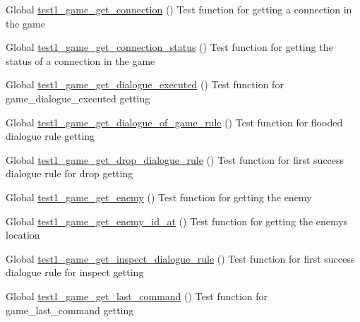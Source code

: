 \begin{DoxyRefList}
\item[Global \mbox{\hyperlink{game__test_8c_a4c69b3df4cea597ed46d4cb428d6f6d9}{test1\+\_\+game\+\_\+get\+\_\+connection}} ()]\label{test__test000258}%
%
Test function for getting a connection in the game  
\item[Global \mbox{\hyperlink{game__test_8c_ad8ab07311d118dabf52340c22652a733}{test1\+\_\+game\+\_\+get\+\_\+connection\+\_\+status}} ()]\label{test__test000255}%
%
Test function for getting the status of a connection in the game  
\item[Global \mbox{\hyperlink{game__test_8c_ad618904912237d3f02b6ef2caec831c6}{test1\+\_\+game\+\_\+get\+\_\+dialogue\+\_\+executed}} ()]\label{test__test000299}%
%
Test function for game\+\_\+dialogue\+\_\+executed getting  
\item[Global \mbox{\hyperlink{game__test_8c_a18a2199e7524df4447b0dd8692e8e6ab}{test1\+\_\+game\+\_\+get\+\_\+dialogue\+\_\+of\+\_\+game\+\_\+rule}} ()]\label{test__test000387}%
%
Test function for flooded dialogue rule getting  
\item[Global \mbox{\hyperlink{game__test_8c_a830a50c5660f906ac1996ef720e68f6b}{test1\+\_\+game\+\_\+get\+\_\+drop\+\_\+dialogue\+\_\+rule}} ()]\label{test__test000344}%
%
Test function for first success dialogue rule for drop getting  
\item[Global \mbox{\hyperlink{game__test_8c_abc613be0a60eb9dcad4df40563e44556}{test1\+\_\+game\+\_\+get\+\_\+enemy}} ()]\label{test__test000174}%
%
Test function for getting the enemy  
\item[Global \mbox{\hyperlink{game__test_8c_a938ae254171ffb5d017c02a70c74c7aa}{test1\+\_\+game\+\_\+get\+\_\+enemy\+\_\+id\+\_\+at}} ()]\label{test__test000180}%
%
Test function for getting the enemy\textquotesingle{}s location  
\item[Global \mbox{\hyperlink{game__test_8c_ad5cc91f1cadd436503d47d768ffd300a}{test1\+\_\+game\+\_\+get\+\_\+inspect\+\_\+dialogue\+\_\+rule}} ()]\label{test__test000351}%
%
Test function for first success dialogue rule for inspect getting  
\item[Global \mbox{\hyperlink{game__test_8c_adffc2120d97aef04f9387431397defbc}{test1\+\_\+game\+\_\+get\+\_\+last\+\_\+command}} ()]\label{test__test000267}%
%
Test function for game\+\_\+last\+\_\+command getting  

\end{DoxyRefList}
